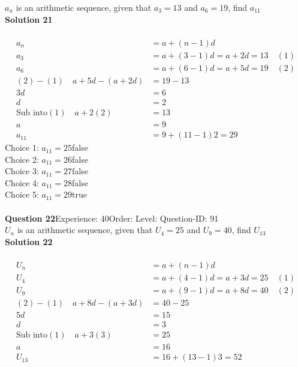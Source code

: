\documentclass{article}
\begin{document}
$a_n$ is an arithmetic sequence, given that $a_3=13$ and $a_6=19$, find $a_{11}$\\[4pt]
\noindent\textbf{Solution 21}\\[2pt]
\\[-35pt]\begin{align*}
a_n&=a+(n-1)d\\[2pt]
a_3&=a+(3-1)d=a+2d=13\quad (1)\\[2pt]
a_6&=a+(6-1)d=a+5d=19\quad (2)\\[2pt]
(2)-(1)\quad a+5d-(a+2d)&=19-13\\[2pt]
3d&=6\\[2pt]
d&=2\\[12pt]
\text{Sub into} (1) \quad a+2(2)&=13\\[2pt]
a&=9\\[12pt]
a_{11}&=9+(11-1)2=29
\end{align*}
Choice 1: \hspace{20pt}$a_{11}=25$\hspace{20pt}false\\
Choice 2: \hspace{20pt}$a_{11}=26$\hspace{20pt}false\\
Choice 3: \hspace{20pt}$a_{11}=27$\hspace{20pt}false\\
Choice 4: \hspace{20pt}$a_{11}=28$\hspace{20pt}false\\
Choice 5: \hspace{20pt}$a_{11}=29$\hspace{20pt}true\\
\\[4pt]
\noindent\textbf{Question 22}\hspace{20pt}Experience: 40\hspace{20pt}Order: \hspace{20pt}Level: \hspace{20pt}Question-ID: 91\\[2pt]
$U_n$ is an arithmetic sequence, given that $U_4=25$ and $U_9=40$, find $U_{13}$\\[4pt]
\noindent\textbf{Solution 22}\\[2pt]
\\[-35pt]\begin{align*}
U_n&=a+(n-1)d\\[2pt]
U_4&=a+(4-1)d=a+3d=25\quad (1)\\[2pt]
U_9&=a+(9-1)d=a+8d=40\quad (2)\\[2pt]
(2)-(1)\quad a+8d-(a+3d)&=40-25\\[2pt]
5d&=15\\[2pt]
d&=3\\[12pt]
\text{Sub into} (1) \quad a+3(3)&=25\\[2pt]
a&=16\\[12pt]
U_{13}&=16+(13-1)3=52\\[-40pt]
\end{align*}
\end{document}
